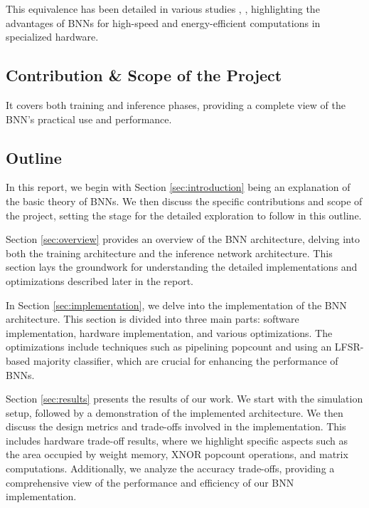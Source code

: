 \documentclass[conference]{IEEEtran}
\newcounter{todocount}
\newcommand{\todo}[1]{
  \stepcounter{todocount}
}
\begin{document}
\todo{these refs} %
\todo{ref other section} %
This equivalence has been detailed in various studies \cite{courbariaux2016binarynet}, \cite{simons2019review}, highlighting the advantages of BNNs for high-speed and energy-efficient computations in specialized hardware.

\subsection{Contribution \& Scope of the Project}
\todo{Rewrite aim, such that our aim was to first achieve a respectable accuracy of 95\% on the MNIST \cite{mnist} dataset, and then further improve the design to optimize on area, power and minimum achievable clock speed.} %

\todo{rewrite this part also include: we used MNIST dataset (with reference), testset of 10.000 images.} %



It covers both training and inference phases, providing a complete view of the BNN's practical use and performance.

\subsection{Outline}
In this report, we begin with Section \ref{sec:introduction} being an explanation of the basic theory of BNNs. We then discuss the specific contributions and scope of the project, setting the stage for the detailed exploration to follow in this outline.

Section \ref{sec:overview} provides an overview of the BNN architecture, delving into both the training architecture and the inference network architecture. This section lays the groundwork for understanding the detailed implementations and optimizations described later in the report.

In Section \ref{sec:implementation}, we delve into the implementation of the BNN architecture. This section is divided into three main parts: software implementation, hardware implementation, and various optimizations. The optimizations include techniques such as pipelining popcount and using an LFSR-based majority classifier, which are crucial for enhancing the performance of BNNs.

Section \ref{sec:results} presents the results of our work. We start with the simulation setup, followed by a demonstration of the implemented architecture. We then discuss the design metrics and trade-offs involved in the implementation. This includes hardware trade-off results, where we highlight specific aspects such as the area occupied by weight memory, XNOR popcount operations, and matrix computations. Additionally, we analyze the accuracy trade-offs, providing a comprehensive view of the performance and efficiency of our BNN implementation.
\end{document}
